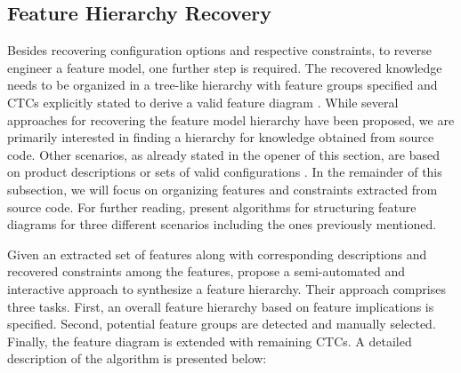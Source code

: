 \subsection{Feature Hierarchy Recovery} 
Besides recovering configuration options and respective constraints, to reverse
engineer a feature model, one further step is required. The recovered knowledge
needs to be organized in a tree-like hierarchy with feature groups specified and
CTCs explicitly stated to derive a valid feature diagram 
\citep{kang_feature-oriented_1990}.
While several approaches for recovering the feature model hierarchy have been
proposed, we are primarily interested in finding a hierarchy for knowledge
obtained from source code. Other scenarios, as already stated in the opener of
this section, are based on product descriptions or sets of valid configurations
\citep{aleti_software_2013,bakar_feature_2015}. In the remainder of this
subsection, we will focus on organizing features and constraints extracted from
source code. For further reading, \cite{andersen_efficient_2012} present algorithms for structuring feature diagrams for three different scenarios including the ones previously mentioned.

Given an extracted set of features along with corresponding descriptions and
recovered constraints among the features, \cite{she_reverse_2011} propose a
semi-automated and interactive approach to synthesize a feature hierarchy.
Their approach comprises three tasks. First, an overall feature hierarchy based
on feature implications is specified. Second, potential feature groups are
detected and manually selected. Finally, the feature diagram is extended with
remaining CTCs. A detailed description of the algorithm is presented below:


